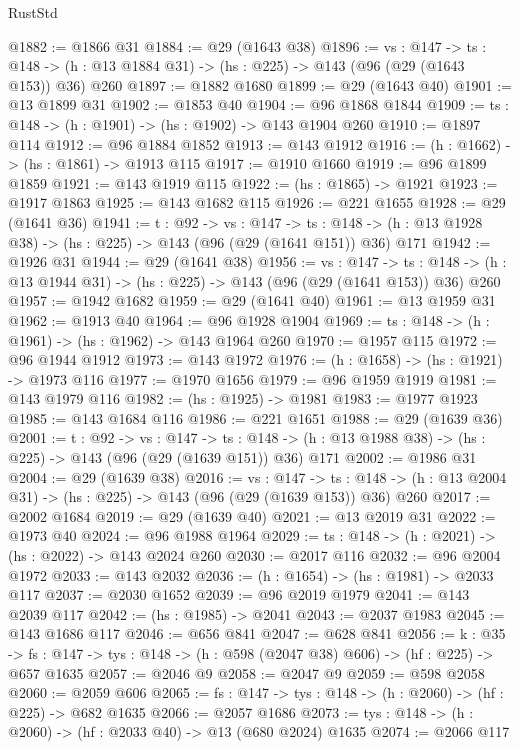 \begin{lexlean}{RustStd}
\begin{coremodule}
@1882 := @1866 @31
@1884 := @29 (@1643 @38)
@1896 := {vs : @147} ->
  {ts : @148} -> (h : @13 @1884 @31) -> (hs : @225) -> @143 (@96 (@29 (@1643 @153)) @36) @260
@1897 := @1882 @1680
@1899 := @29 (@1643 @40)
@1901 := @13 @1899 @31
@1902 := @1853 @40
@1904 := @96 @1868 @1844
@1909 := {ts : @148} -> (h : @1901) -> (hs : @1902) -> @143 @1904 @260
@1910 := @1897 @114
@1912 := @96 @1884 @1852
@1913 := @143 @1912
@1916 := (h : @1662) -> (hs : @1861) -> @1913 @115
@1917 := @1910 @1660
@1919 := @96 @1899 @1859
@1921 := @143 @1919 @115
@1922 := (hs : @1865) -> @1921
@1923 := @1917 @1863
@1925 := @143 @1682 @115
@1926 := @221 @1655
@1928 := @29 (@1641 @36)
@1941 := {t : @92} ->
  {vs : @147} ->
  {ts : @148} -> (h : @13 @1928 @38) -> (hs : @225) -> @143 (@96 (@29 (@1641 @151)) @36) @171
@1942 := @1926 @31
@1944 := @29 (@1641 @38)
@1956 := {vs : @147} ->
  {ts : @148} -> (h : @13 @1944 @31) -> (hs : @225) -> @143 (@96 (@29 (@1641 @153)) @36) @260
@1957 := @1942 @1682
@1959 := @29 (@1641 @40)
@1961 := @13 @1959 @31
@1962 := @1913 @40
@1964 := @96 @1928 @1904
@1969 := {ts : @148} -> (h : @1961) -> (hs : @1962) -> @143 @1964 @260
@1970 := @1957 @115
@1972 := @96 @1944 @1912
@1973 := @143 @1972
@1976 := (h : @1658) -> (hs : @1921) -> @1973 @116
@1977 := @1970 @1656
@1979 := @96 @1959 @1919
@1981 := @143 @1979 @116
@1982 := (hs : @1925) -> @1981
@1983 := @1977 @1923
@1985 := @143 @1684 @116
@1986 := @221 @1651
@1988 := @29 (@1639 @36)
@2001 := {t : @92} ->
  {vs : @147} ->
  {ts : @148} -> (h : @13 @1988 @38) -> (hs : @225) -> @143 (@96 (@29 (@1639 @151)) @36) @171
@2002 := @1986 @31
@2004 := @29 (@1639 @38)
@2016 := {vs : @147} ->
  {ts : @148} -> (h : @13 @2004 @31) -> (hs : @225) -> @143 (@96 (@29 (@1639 @153)) @36) @260
@2017 := @2002 @1684
@2019 := @29 (@1639 @40)
@2021 := @13 @2019 @31
@2022 := @1973 @40
@2024 := @96 @1988 @1964
@2029 := {ts : @148} -> (h : @2021) -> (hs : @2022) -> @143 @2024 @260
@2030 := @2017 @116
@2032 := @96 @2004 @1972
@2033 := @143 @2032
@2036 := (h : @1654) -> (hs : @1981) -> @2033 @117
@2037 := @2030 @1652
@2039 := @96 @2019 @1979
@2041 := @143 @2039 @117
@2042 := (hs : @1985) -> @2041
@2043 := @2037 @1983
@2045 := @143 @1686 @117
@2046 := @656 @841
@2047 := @628 @841
@2056 := {k : @35} ->
  {fs : @147} -> {tys : @148} -> (h : @598 (@2047 @38) @606) -> (hf : @225) -> @657 @1635
@2057 := @2046 @9
@2058 := @2047 @9
@2059 := @598 @2058
@2060 := @2059 @606
@2065 := {fs : @147} -> {tys : @148} -> (h : @2060) -> (hf : @225) -> @682 @1635
@2066 := @2057 @1686
@2073 := {tys : @148} -> (h : @2060) -> (hf : @2033 @40) -> @13 (@680 @2024) @1635
@2074 := @2066 @117

\end{coremodule}
\end{lexlean}
